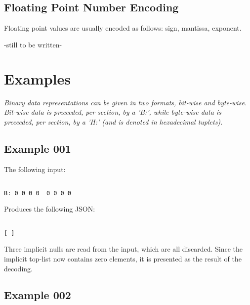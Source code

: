 \subsection{Floating Point Number Encoding}

Floating point values are usually encoded as follows: sign, mantissa, exponent.

-still to be written-

\section{Examples}

\textit{
Binary data representations can be given in two formats, bit-wise and byte-wise.
Bit-wise data is preceeded, per section, by a 'B:',
while byte-wise data is preceeded, per section, by a 'H:' (and is denoted in
hexadecimal tuplets).
}

\subsection{Example 001}

The following input:

\begin{changemargin}{-60mm}{0mm}
\begin{myquote}
\begin{verbatim}

B: 0 0 0 0  0 0 0 0

\end{verbatim}
\end{myquote}
\end{changemargin}

Produces the following JSON:

\begin{changemargin}{-60mm}{0mm}
\begin{myquote}
\begin{verbatim}

[ ]

\end{verbatim}
\end{myquote}
\end{changemargin}

Three implicit nulls are read from the input, which are all discarded.
Since the implicit top-list now contains zero elements, it is presented
as the result of the decoding.

\subsection{Example 002}

